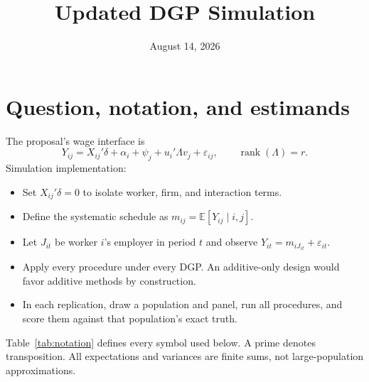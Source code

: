\documentclass[11pt]{article}
\title{Updated DGP Simulation}
\author{}
\date{August 14, 2026}
\newcommand{\E}{\mathbb{E}}
\begin{document}
\maketitle

\section{Question, notation, and estimands}

The proposal's wage interface is
\begin{equation}
Y_{ij}=X_{ij}'\delta+\alpha_i+\psi_j+u_i'\Lambda v_j+
\varepsilon_{ij},\qquad \operatorname{rank}(\Lambda)=r.
\label{eq:proposal-model}
\end{equation}
Simulation implementation:
\begin{itemize}
\item Set $X_{ij}'\delta=0$ to isolate worker, firm, and interaction terms.
\item Define the systematic schedule as $m_{ij}=\E[Y_{ij}\mid i,j]$.
\item Let $J_{it}$ be worker $i$'s employer in period $t$ and observe
$Y_{it}=m_{iJ_{it}}+\varepsilon_{it}$.
\item Apply every procedure under every DGP.  An additive-only design would
favor additive methods by construction.
\item In each replication, draw a population and panel, run all procedures,
and score them against that population's exact truth.
\end{itemize}

Table~\ref{tab:notation} defines every symbol used below.  A prime denotes
transposition.  All expectations and variances are finite sums, not
large-population approximations.
\end{document}
